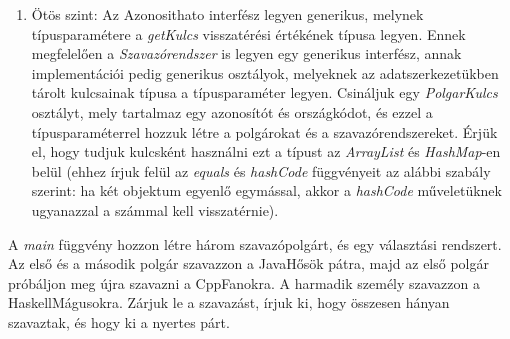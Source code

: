\documentclass[12pt,a4paper]{article}
\begin{document}
\begin{enumerate}
\item Ötös szint: Az Azonosithato interfész legyen generikus, melynek típusparamétere 
a \textit{getKulcs} visszatérési értékének típusa legyen. Ennek megfelelően a
\textit{Szavazórendszer} is legyen egy generikus interfész, annak implementációi 
pedig generikus osztályok, melyeknek az adatszerkezetükben tárolt kulcsainak típusa 
a típusparaméter legyen. Csináljuk egy \textit{PolgarKulcs} osztályt, mely tartalmaz 
egy azonosítót és országkódot, és ezzel a típusparaméterrel hozzuk létre a polgárokat 
és a szavazórendszereket. Érjük el, hogy tudjuk kulcsként használni ezt a típust az 
\textit{ArrayList} és \textit{HashMap}-en belül (ehhez írjuk felül az \textit{equals}
és \textit{hashCode} függvényeit az alábbi szabály szerint: ha két objektum egyenlő
egymással, akkor a \textit{hashCode} műveletüknek ugyanazzal a számmal kell visszatérnie).

\end{enumerate}

A \textit{main} függvény hozzon létre három szavazópolgárt, és egy választási rendszert.
Az első és a második polgár szavazzon a JavaHősök pátra, majd az első polgár próbáljon
meg újra szavazni a CppFanokra. A harmadik személy szavazzon a HaskellMágusokra. 
Zárjuk le a szavazást, írjuk ki, hogy összesen hányan szavaztak, és hogy ki a nyertes párt.
\end{document}
